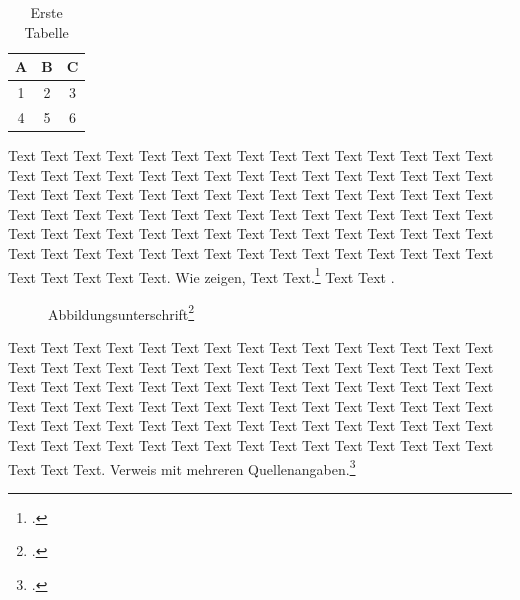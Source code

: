 \begin{table}[tb]
    \centering
    \begin{tabular}{ccc}
        \toprule
        A & B & C \\
        \midrule
        1 & 2 & 3 \\
        4 & 5 & 6 \\
        \bottomrule
    \end{tabular}
    \caption{Erste Tabelle}\label{tab:1}
\end{table}
Text Text Text Text Text Text Text Text Text Text Text Text Text Text Text Text Text Text Text Text Text Text Text Text Text Text Text Text Text Text Text Text Text Text Text Text Text Text Text Text Text Text Text  Text Text Text Text Text Text Text Text Text Text Text Text Text Text Text Text Text Text Text Text Text Text Text Text Text Text Text Text Text Text Text Text Text Text Text Text Text Text Text Text Text Text Text Text Text Text Text Text Text Text Text Text. Wie \citeauthor{bortfeldt_constraints_2013} zeigen, Text Text.\footcite[Vgl.][33]{ceschia_local_2013} Text Text .

\begin{figure}[h]
    \centering
    \caption[Abbildungsunterschrift]{Abbildungsunterschrift\footcite[Vgl.][39]{zhang_hybrid_2017}}
\end{figure}


Text Text Text Text Text Text Text Text Text Text Text Text Text Text Text Text Text Text Text Text Text Text Text Text Text Text Text Text Text Text Text Text Text Text Text Text Text Text Text Text Text Text Text Text Text Text Text Text Text Text Text Text Text Text Text Text Text Text Text Text Text Text Text Text Text Text Text Text Text Text Text Text Text Text Text Text Text Text Text Text Text Text Text Text Text Text Text Text Text Text Text Text Text. Verweis mit mehreren Quellenangaben.\footcites(Vgl.)()[][24]{gendreau_tabu_2006}[][15]{krebs_advanced_2021}
